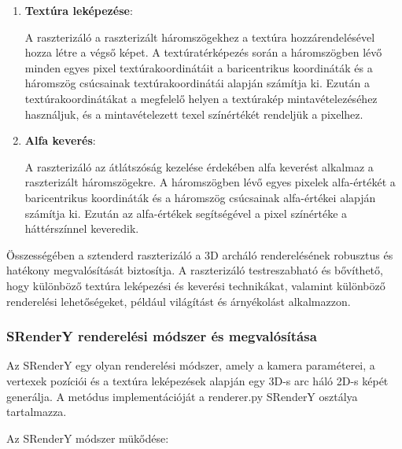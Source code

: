 \documentclass[12pt,a4]{article}
\begin{document}
\begin{enumerate}
     \item \textbf{Textúra leképezése}:
     
     A raszterizáló a raszterizált háromszögekhez a textúra hozzárendelésével  hozza létre a végső képet. 
A textúratérképezés során a háromszögben lévő minden egyes pixel textúrakoordinátáit a baricentrikus koordináták és a háromszög csúcsainak textúrakoordinátái alapján számítja ki.
	Ezután a textúrakoordinátákat a megfelelő helyen a textúrakép mintavételezéséhez használjuk, és a mintavételezett texel színértékét rendeljük a pixelhez.
 
     \item \textbf{Alfa keverés}:
     
     A raszterizáló az átlátszóság kezelése érdekében alfa keverést alkalmaz a raszterizált háromszögekre. 
	A háromszögben lévő egyes pixelek alfa-értékét a baricentrikus koordináták és a háromszög csúcsainak alfa-értékei alapján számítja ki. 
	Ezután az alfa-értékek segítségével a pixel színértéke a háttérszínnel keveredik.
 
 \end{enumerate}
 
 Összességében a sztenderd raszterizáló a 3D archáló renderelésének robusztus és hatékony megvalósítását biztosítja.
 A raszterizáló testreszabható és bővíthető, hogy különböző textúra leképezési és keverési technikákat, valamint különböző renderelési lehetőségeket, például világítást és árnyékolást alkalmazzon.

\subsubsection{SRenderY renderelési módszer és megvalósítása}


 Az SRenderY egy olyan renderelési módszer, amely a kamera paraméterei, a vertexek pozíciói és a textúra leképezések alapján egy 3D-s arc háló 2D-s képét generálja. A metódus implementációját a renderer.py SRenderY osztálya tartalmazza. 

 Az SRenderY módszer mükődése:
\end{document}
